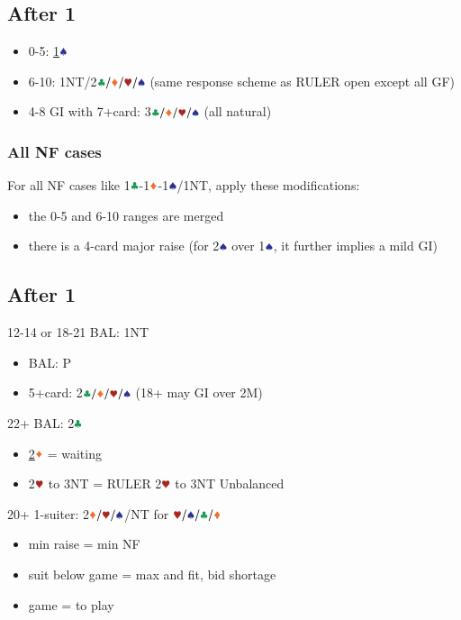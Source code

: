 \documentclass{article}
\begin{document}
\begin{multicols}{2}
\begin{CJK*}{UTF8}{gt}
\subsection{After 1\HHH}\label{sec:1c1d1h}
\begin{itemize}
    \item 0-5: \hyperref[sec:1c1d1h1s]{1$\sss$}
    \item 6-10: 1NT/2$\ccc/\ddd/\hhh/\sss$
        (same response scheme as RULER open except all GF)
    \item 4-8 GI with 7+card: 3$\ccc/\ddd/\hhh/\sss$ (all natural)
\end{itemize}\vspace{1em}

\subsubsection{All NF cases}\label{sec:1c1d-nf}
\noindent For all NF cases like 1$\ccc$-1$\ddd$-1$\sss$/1NT, apply these modifications:
\begin{itemize}
    \item the 0-5 and 6-10 ranges are merged
    \item there is a 4-card major raise (for 2$\sss$ over 1$\sss$, it further implies a mild GI)
\end{itemize}

\subsection{After 1\SSS}
\label{sec:1c1d1h1s}
\begin{itemize}\begin{samepage}
    \item 12-14 or 18-21 BAL: 1NT
    \begin{itemize}
        \item BAL: P
        \item 5+card: 2$\ccc/\ddd/\hhh/\sss$ (18+ may GI over 2M)
    \end{itemize}
    \item 22+ BAL: 2$\ccc$
    \begin{itemize}
        \item \hyperref[sec:1c1d1h1s2c2d]{2$\ddd$} = waiting
        \item 2$\hhh$ to 3NT = RULER 2$\hhh$ to 3NT Unbalanced
    \end{itemize}
    \item 20+ 1-suiter: 2$\ddd/\hhh/\sss$/NT for $\hhh/\sss/\ccc/\ddd$
    \begin{itemize}
        \item min raise = min NF
        \item suit below game = max and fit, bid shortage
        \item game = to play
    \end{itemize}
\end{samepage}\end{itemize}


\end{CJK*}
\end{multicols}
\end{document}
